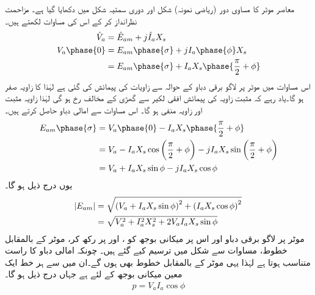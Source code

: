 معاصر موٹر کا مساوی دور (ریاضی نمونہ) شکل    اور دوری سمتیہ شکل   میں دکھایا گیا ہے۔  مزاحمت نظرانداز کر کے اس کی مساوات لکھتے ہیں۔
\begin{gather}
\begin{aligned}
\hat{V}_a&=\hat{E}_{am}+j \hat{I}_a X_s\\
V_a \phase{0}&=E_{am} \phase{\sigma} +j I_a \phase{\phi} X_s\\
&=E_{am} \phase{\sigma} +I_a X_s \phase{\frac{\pi}{2}+\phi}
\end{aligned}
\end{gather}
اس مساوات میں موٹر پر لاگو برقی دباو  کے حوالہ سے زاویات کی پیمائش کی گئی ہے لہٰذا    کا زاویہ صفر ہو گا۔یاد رہے کہ مثبت زاویہ کی پیمائش افقی لکیر سے گھڑی کے مخالف رخ ہو گی  لہٰذا  زاویہ مثبت اور  زاویہ منفی ہو گا۔ اس مساوات سے امالی دباو   حاصل کرتے ہیں۔
\begin{align*}
E_{am}\phase{\sigma}&=V_a \phase{0}-I_a X_s \phase{\frac{\pi}{2}+\phi}\\
&=V_a -I_a X_s  \cos \left( \frac{\pi}{2}+\phi\right)- j I_a X_s \sin \left(\frac{\pi}{2}+\phi \right)\\
&=V_a +I_a X_s \sin \phi-j I_a X_s \cos \phi
\end{align*}
یوں  درج ذیل ہو گا۔
\begin{gather}
\begin{aligned}\label{مسوات_معاصر_دوری_مساوات}
\abs{E_{am}}&=\sqrt{\left(V_a +I_a X_s \sin \phi \right)^2+\left(I_a X_s \cos \phi \right)^2}\\
&=\sqrt{V_a^2+I_a^2 X_s^2+ 2 V_a I_a X_s \sin \phi}
\end{aligned}
\end{gather}
موٹر پر لاگو برقی دباو اور اس پر میکانی بوجھ کو ،  اور  پر رکھ کر، موٹر کے  بالمقابل   خطوط،  مساوات  سے  شکل    میں  ترسیم کیے گئے ہیں۔ چونکہ امالی دباو  کا راست متناسب ہوتا ہے  لہٰذا یہی موٹر کے  بالمقابل  خطوط بھی ہوں گے۔ان میں سے ہر خط ایک معین میکانی بوجھ  کے لئے ہے جہاں  درج ذیل ہو گا۔
\begin{align}\label{مساوات_معاصر_طاقت_برابر_دباو_رو_جزو_طاقت}
p=V_a I_a \cos \phi
\end{align}
